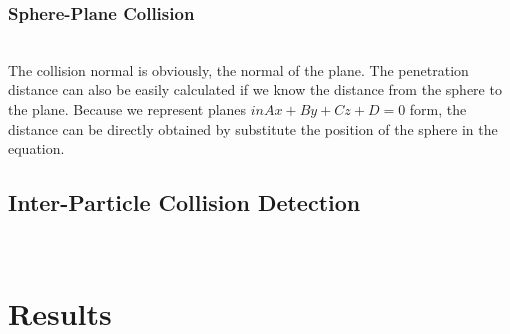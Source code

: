 \documentclass[acmtog]{acmart}
\begin{document}
\subsubsection{Sphere-Plane Collision}
\quad \\
The collision normal is obviously, the normal of the plane. The penetration distance can also be easily calculated if we know the distance from the sphere to the plane. Because we represent planes $in Ax+By+Cz+D = 0$ form, the distance can be directly obtained by substitute the position of the sphere in the equation.
\subsection{Inter-Particle Collision Detection}
\pagebreak
\quad \\

\pagebreak
\section{Results}

\vspace{20mm}
\end{document}
